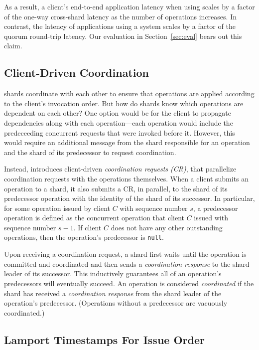 As a result, a client's end-to-end application latency when using \sys{} scales by a factor
of the one-way cross-shard latency as the number of operations increases. In contrast,
the latency of applications using a \singledispatch{} system scales by a factor of the
quorum round-trip latency. Our evaluation in Section~\ref{sec:eval} bears out this claim.

\subsection{Client-Driven Coordination}

\sys{} shards coordinate with each other to ensure that operations are applied
according to the client's invocation order. But how do shards know which
operations are dependent on each other? One option would be for the client to
propagate dependencies along with each operation---each operation would include
the predeceeding concurrent requests that were invoked before it. However, this
would require an additional message from the shard responsible for an operation
and the shard of its predecessor to request coordination.

Instead, \sys{} introduces client-driven \textit{coordination requests (CR)},
that parallelize coordination requests with the operations themselves.  When a
client submits an operation to a shard, it also submits a CR, in parallel, to
the shard of its predecessor operation with the identity of the shard of its
successor.  In particular, for some operation issued by client $C$ with sequence
number $s$, a predecessor operation is defined as the concurrent operation that
client $C$ issued with sequence number $s-1$. If client $C$ does not have any
other outstanding operations, then the operation's predecessor is \texttt{null}.

Upon receiving a coordination request, a shard first waits until the operation
is committed and coordinated and then sends a \textit{coordination response} to
the shard leader of its successor. This inductively guarantees all of an
operation's predecessors will eventually succeed. An operation is considered
\textit{coordinated} if the shard has received a \textit{coordination response}
from the shard leader of the operation's predecessor.  (Operations without a
predecessor are vacuously coordinated.)

\subsection{Lamport Timestamps For Issue Order}\label{sec:design:timestamps}

